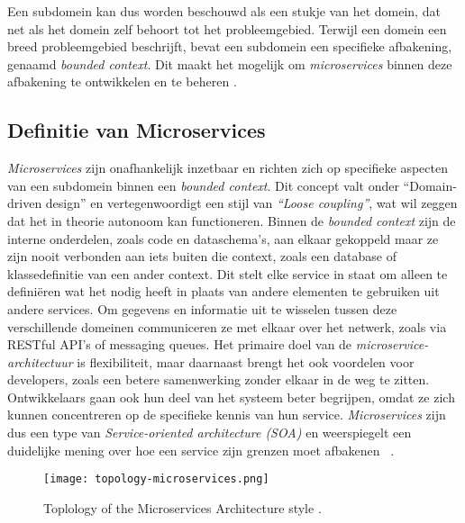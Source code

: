 Een subdomein kan dus worden beschouwd als een stukje van het domein, 
dat net als het domein zelf behoort tot het probleemgebied.   
Terwijl een domein een breed probleemgebied beschrijft, bevat een subdomein een specifieke afbakening, genaamd \emph{bounded context}.
Dit maakt het mogelijk om \emph{microservices} binnen deze afbakening te ontwikkelen en te beheren \autocite{Bellemare2020}.

\subsection{Definitie van Microservices}
\emph{Microservices} zijn onafhankelijk inzetbaar en richten zich op specifieke aspecten van een 
subdomein binnen een \emph{bounded context}. 
Dit concept valt onder ``Domain-driven design'' en vertegenwoordigt een stijl van \emph{``Loose coupling''}, 
wat wil zeggen dat het in theorie autonoom kan functioneren.
Binnen de \emph{bounded context} zijn de interne onderdelen, zoals code en dataschema's, aan elkaar gekoppeld maar ze zijn nooit verbonden 
aan iets buiten die context, zoals een database of klassedefinitie van een ander context. 
Dit stelt elke service in staat om alleen te definiëren wat het nodig heeft in plaats van andere elementen te gebruiken uit andere services.
Om gegevens en informatie uit te wisselen tussen deze verschillende domeinen communiceren ze met elkaar over het netwerk, 
zoals via RESTful API's of messaging queues. 
Het primaire doel van de \emph{microservice-architectuur} is flexibiliteit, maar daarnaast brengt het ook voordelen voor developers, 
zoals een betere samenwerking zonder elkaar in de weg te zitten. 
Ontwikkelaars gaan ook hun deel van het systeem beter begrijpen, omdat ze zich kunnen 
concentreren op de specifieke kennis van hun service.
\emph{Microservices} zijn dus een type van \emph{Service-oriented architecture (SOA)} en weerspiegelt een duidelijke mening over hoe een 
service zijn grenzen moet afbakenen ~\autocite{Newman2020}.
\newline

\begin{figure}[H]
  \centering
  \texttt{[image: topology-microservices.png]}
  \caption{\label{fig:img}Toplology of the Microservices Architecture style \autocite[figure 17 - 1]{MarkRichards2021}.}
\end{figure}

 
